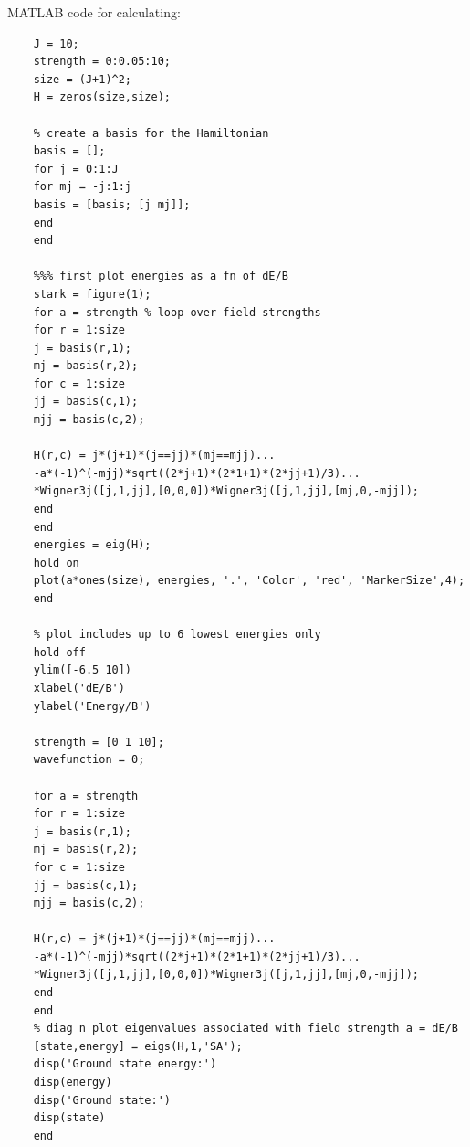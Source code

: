 \documentclass{article}
\theoremstyle{definition}
\begin{document}
MATLAB code for calculating:
	\begin{lstlisting}
	J = 10;
	strength = 0:0.05:10;
	size = (J+1)^2;
	H = zeros(size,size);
	
	% create a basis for the Hamiltonian
	basis = [];
	for j = 0:1:J
	for mj = -j:1:j
	basis = [basis; [j mj]];
	end
	end
	
	%%% first plot energies as a fn of dE/B
	stark = figure(1);
	for a = strength % loop over field strengths
	for r = 1:size
	j = basis(r,1);
	mj = basis(r,2);
	for c = 1:size     
	jj = basis(c,1);  
	mjj = basis(c,2);
	
	H(r,c) = j*(j+1)*(j==jj)*(mj==mjj)...
	-a*(-1)^(-mjj)*sqrt((2*j+1)*(2*1+1)*(2*jj+1)/3)...
	*Wigner3j([j,1,jj],[0,0,0])*Wigner3j([j,1,jj],[mj,0,-mjj]);             
	end
	end
	energies = eig(H);
	hold on 
	plot(a*ones(size), energies, '.', 'Color', 'red', 'MarkerSize',4);
	end
		
	% plot includes up to 6 lowest energies only
	hold off
	ylim([-6.5 10])
	xlabel('dE/B')
	ylabel('Energy/B')
		
	strength = [0 1 10];
	wavefunction = 0;
	
	for a = strength 
	for r = 1:size
	j = basis(r,1);
	mj = basis(r,2);
	for c = 1:size     
	jj = basis(c,1);  
	mjj = basis(c,2);
	
	H(r,c) = j*(j+1)*(j==jj)*(mj==mjj)...
	-a*(-1)^(-mjj)*sqrt((2*j+1)*(2*1+1)*(2*jj+1)/3)...
	*Wigner3j([j,1,jj],[0,0,0])*Wigner3j([j,1,jj],[mj,0,-mjj]);             
	end
	end
	% diag n plot eigenvalues associated with field strength a = dE/B
	[state,energy] = eigs(H,1,'SA');
	disp('Ground state energy:')
	disp(energy)
	disp('Ground state:')
	disp(state) 
	end
\end{lstlisting}
\end{document}
